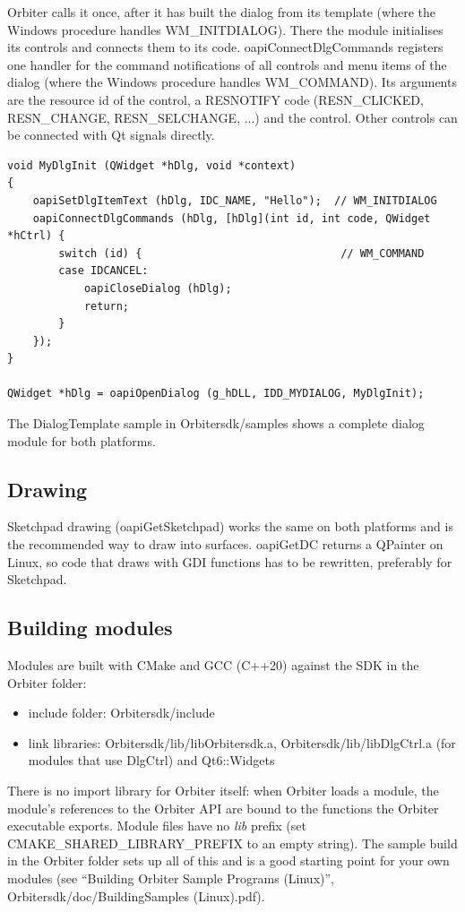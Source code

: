 \documentclass[Orbiter Developer Manual.tex]{subfiles}
\begin{document}
\noindent
Orbiter calls it once, after it has built the dialog from its template (where the Windows procedure handles WM\_INITDIALOG). There the module initialises its controls and connects them to its code. oapiConnectDlgCommands registers one handler for the command notifications of all controls and menu items of the dialog (where the Windows procedure handles WM\_COMMAND). Its arguments are the resource id of the control, a RESNOTIFY code (RESN\_CLICKED, RESN\_CHANGE, RESN\_SELCHANGE, ...) and the control. Other controls can be connected with Qt signals directly.

\begin{lstlisting}
void MyDlgInit (QWidget *hDlg, void *context)
{
	oapiSetDlgItemText (hDlg, IDC_NAME, "Hello");  // WM_INITDIALOG
	oapiConnectDlgCommands (hDlg, [hDlg](int id, int code, QWidget *hCtrl) {
		switch (id) {                               // WM_COMMAND
		case IDCANCEL:
			oapiCloseDialog (hDlg);
			return;
		}
	});
}

QWidget *hDlg = oapiOpenDialog (g_hDLL, IDD_MYDIALOG, MyDlgInit);
\end{lstlisting}

\noindent
The DialogTemplate sample in Orbitersdk/samples shows a complete dialog module for both platforms.


\subsection{Drawing}
Sketchpad drawing (oapiGetSketchpad) works the same on both platforms and is the recommended way to draw into surfaces. oapiGetDC returns a QPainter on Linux, so code that draws with GDI functions has to be rewritten, preferably for Sketchpad.


\subsection{Building modules}
Modules are built with CMake and GCC (C++20) against the SDK in the Orbiter folder:

\begin{itemize}
\item include folder: Orbitersdk/include
\item link libraries: Orbitersdk/lib/libOrbitersdk.a, Orbitersdk/lib/libDlgCtrl.a (for modules that use DlgCtrl) and Qt6::Widgets
\end{itemize}

\noindent
There is no import library for Orbiter itself: when Orbiter loads a module, the module's references to the Orbiter API are bound to the functions the Orbiter executable exports. Module files have no \textit{lib} prefix (set CMAKE\_SHARED\_LIBRARY\_PREFIX to an empty string). The sample build in the Orbiter folder sets up all of this and is a good starting point for your own modules (see ``Building Orbiter Sample Programs (Linux)'', Orbitersdk/doc/BuildingSamples (Linux).pdf).
\end{document}

